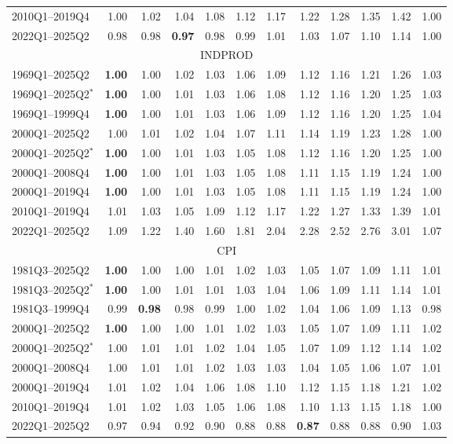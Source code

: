 \begin{tabular}{lrrrrrrrrrrr}
2010Q1--2019Q4 & 1.00 & 1.02 & 1.04 & 1.08 & 1.12 & 1.17 & 1.22 & 1.28 & 1.35 & 1.42 & 1.00 \\
2022Q1--2025Q2 & 0.98 & 0.98 & \textbf{0.97} & 0.98 & 0.99 & 1.01 & 1.03 & 1.07 & 1.10 & 1.14 & 1.00 \\
\hline
\multicolumn{12}{c}{INDPROD} \\
1969Q1--2025Q2 & \textbf{1.00} & 1.00 & 1.02 & 1.03 & 1.06 & 1.09 & 1.12 & 1.16 & 1.21 & 1.26 & 1.03 \\
1969Q1--2025Q2$^*$ & \textbf{1.00} & 1.00 & 1.01 & 1.03 & 1.06 & 1.08 & 1.12 & 1.16 & 1.20 & 1.25 & 1.03 \\
1969Q1--1999Q4 & \textbf{1.00} & 1.00 & 1.01 & 1.03 & 1.06 & 1.09 & 1.12 & 1.16 & 1.20 & 1.25 & 1.04 \\
2000Q1--2025Q2 & 1.00 & 1.01 & 1.02 & 1.04 & 1.07 & 1.11 & 1.14 & 1.19 & 1.23 & 1.28 & 1.00 \\
2000Q1--2025Q2$^*$ & \textbf{1.00} & 1.00 & 1.01 & 1.03 & 1.05 & 1.08 & 1.12 & 1.16 & 1.20 & 1.25 & 1.00 \\
2000Q1--2008Q4 & \textbf{1.00} & 1.00 & 1.01 & 1.03 & 1.05 & 1.08 & 1.11 & 1.15 & 1.19 & 1.24 & 1.00 \\
2000Q1--2019Q4 & \textbf{1.00} & 1.00 & 1.01 & 1.03 & 1.05 & 1.08 & 1.11 & 1.15 & 1.19 & 1.24 & 1.00 \\
2010Q1--2019Q4 & 1.01 & 1.03 & 1.05 & 1.09 & 1.12 & 1.17 & 1.22 & 1.27 & 1.33 & 1.39 & 1.01 \\
2022Q1--2025Q2 & 1.09 & 1.22 & 1.40 & 1.60 & 1.81 & 2.04 & 2.28 & 2.52 & 2.76 & 3.01 & 1.07 \\
\hline
\multicolumn{12}{c}{CPI} \\
1981Q3--2025Q2 & \textbf{1.00} & 1.00 & 1.00 & 1.01 & 1.02 & 1.03 & 1.05 & 1.07 & 1.09 & 1.11 & 1.01 \\
1981Q3--2025Q2$^*$ & \textbf{1.00} & 1.00 & 1.01 & 1.01 & 1.03 & 1.04 & 1.06 & 1.09 & 1.11 & 1.14 & 1.01 \\
1981Q3--1999Q4 & 0.99 & \textbf{0.98} & 0.98 & 0.99 & 1.00 & 1.02 & 1.04 & 1.06 & 1.09 & 1.13 & 0.98 \\
2000Q1--2025Q2 & \textbf{1.00} & 1.00 & 1.00 & 1.01 & 1.02 & 1.03 & 1.05 & 1.07 & 1.09 & 1.11 & 1.02 \\
2000Q1--2025Q2$^*$ & 1.00 & 1.01 & 1.01 & 1.02 & 1.04 & 1.05 & 1.07 & 1.09 & 1.12 & 1.14 & 1.02 \\
2000Q1--2008Q4 & 1.00 & 1.01 & 1.01 & 1.02 & 1.03 & 1.03 & 1.04 & 1.05 & 1.06 & 1.07 & 1.01 \\
2000Q1--2019Q4 & 1.01 & 1.02 & 1.04 & 1.06 & 1.08 & 1.10 & 1.12 & 1.15 & 1.18 & 1.21 & 1.02 \\
2010Q1--2019Q4 & 1.01 & 1.02 & 1.03 & 1.05 & 1.06 & 1.08 & 1.10 & 1.13 & 1.15 & 1.18 & 1.00 \\
2022Q1--2025Q2 & 0.97 & 0.94 & 0.92 & 0.90 & 0.88 & 0.88 & \textbf{0.87} & 0.88 & 0.88 & 0.90 & 1.03 \\
\hline
\end{tabular}
